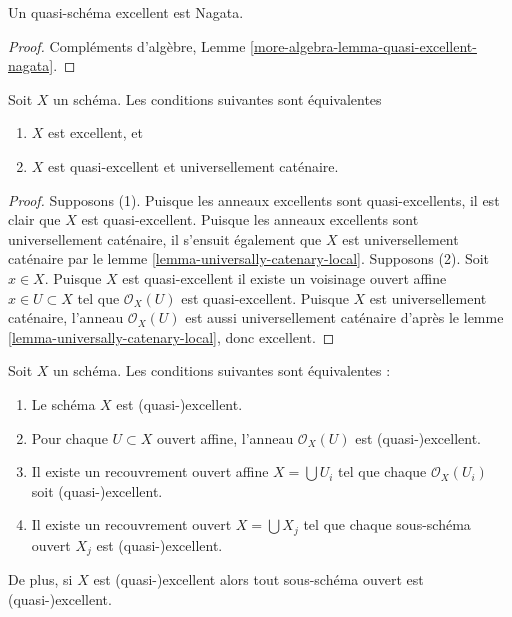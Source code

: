 \begin{lemma}
\label{lemma-quasi-excellent-nagata}
Un quasi-schéma excellent est Nagata.
\end{lemma}

\begin{proof}
Compléments d'algèbre, Lemme \ref{more-algebra-lemma-quasi-excellent-nagata}.
\end{proof}

\begin{lemma}
\label{lemma-characterize-excellent}
Soit $X$ un schéma. Les conditions suivantes sont équivalentes
\begin{enumerate}
\item $X$ est excellent, et
\item $X$ est quasi-excellent et universellement caténaire.
\end{enumerate}
\end{lemma}

\begin{proof}
Supposons (1). Puisque les anneaux excellents sont quasi-excellents,
il est clair que $X$ est quasi-excellent. Puisque les anneaux
excellents sont universellement caténaire, il s'ensuit également
que $X$ est universellement caténaire par le lemme
\ref{lemma-universally-catenary-local}. Supposons (2). Soit $x \in X$. Puisque $X$
est quasi-excellent il existe un voisinage
ouvert affine $x \in U \subset X$ tel que $\mathcal{O}_X(U)$ est quasi-excellent.
Puisque $X$ est universellement caténaire, l'anneau
$\mathcal{O}_X(U)$ est aussi universellement caténaire d'après le lemme \ref{lemma-universally-catenary-local},
donc excellent.
\end{proof}

\begin{lemma}
\label{lemma-locally-excellent}
Soit $X$ un schéma. Les conditions suivantes sont équivalentes :
\begin{enumerate}
\item Le schéma $X$ est (quasi-)excellent.
\item Pour chaque $U \subset X$ ouvert affine, l'anneau $\mathcal{O}_X(U)$ est
(quasi-)excellent.
\item Il existe un recouvrement ouvert affine $X = \bigcup U_i$ tel que
chaque $\mathcal{O}_X(U_i)$ soit (quasi-)excellent.
\item Il existe un recouvrement ouvert $X = \bigcup X_j$ tel que
chaque sous-schéma ouvert $X_j$ est (quasi-)excellent.
\end{enumerate}
De plus, si $X$ est (quasi-)excellent alors tout sous-schéma ouvert
est (quasi-)excellent.
\end{lemma}

